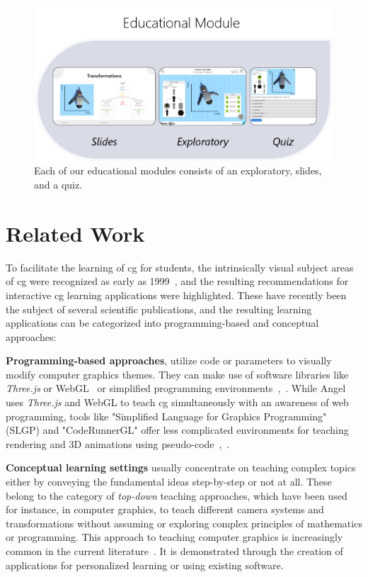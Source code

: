 \begin{figure}[b!th]
	\centering
	\includegraphics[width=0.8\linewidth]{pictures/ExGoerContents.png}
	\captionsetup{labelfont=bf,textfont=it}
	\caption{Each of our educational modules consists of an exploratory, slides, and a quiz.\label{fig:contents}}
\end{figure}


\section{Related Work} %
To facilitate the learning of \acrshort{cg} for students, the intrinsically visual subject areas of \acrshort{cg} were recognized as early as 1999~\cite{Balreira:2017:topics-cg-teaching}, and the resulting recommendations for interactive \acrshort{cg} learning applications were highlighted. These have recently been the subject of several scientific publications, and the resulting learning applications can be categorized into programming-based and conceptual approaches:

\textbf{Programming-based approaches}, utilize code or parameters to visually modify computer graphics themes. They can make use of software libraries like \emph{Three.js} or WebGL~\cite{angel:2017:interactive} or simplified programming environments~\cite{Sueyasu:2010:cg-tool},~\cite{Lobb:2016:cg-tool}. While Angel~\cite{angel:2017:interactive} uses \emph{Three.js} and WebGL to teach \acrshort{cg} simultaneously with an awareness of web programming, tools like "Simplified Language for Graphics Programming" (SLGP) and "CodeRunnerGL" offer less complicated environments for teaching rendering and 3D animations using pseudo-code~\cite{Sueyasu:2010:cg-tool},~\cite{Lobb:2016:cg-tool}.

\textbf{Conceptual learning settings} usually concentrate on teaching complex topics either by conveying the fundamental ideas step-by-step or not at all. These belong to the category of \emph{top-down} teaching approaches, which have been used for instance, in computer graphics, to teach different camera systems and transformations without assuming or exploring complex principles of mathematics or programming. This approach to teaching computer graphics is increasingly common in the current literature~\cite{Suselo:2019:problems-cg-teaching}. It is demonstrated through the creation of applications for personalized learning or using existing software.

